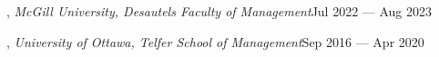 , \textit{McGill University, Desautels Faculty of Management}\hfill Jul 2022 --- Aug 2023
\vspace{0.3em}

, \textit{University of Ottawa, Telfer School of Management}\hfill Sep 2016 --- Apr 2020
\vspace{0.75em}



